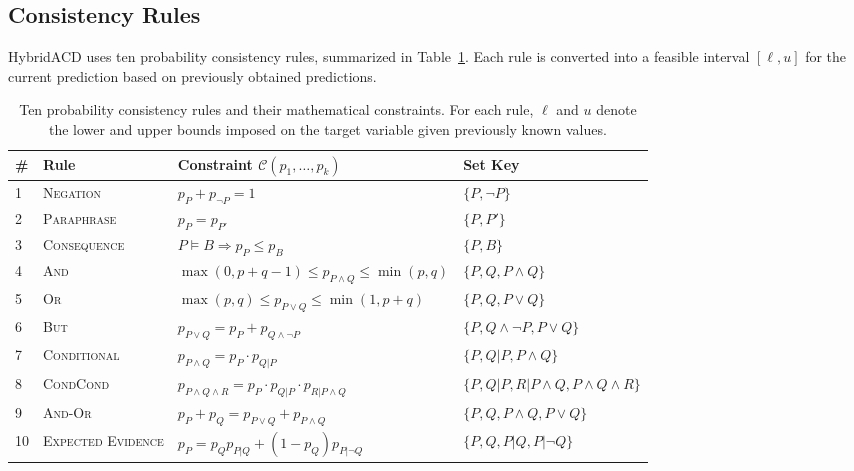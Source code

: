 \documentclass[pdflatex,sn-mathphys-num]{sn-jnl}
\begin{document}
\subsection{Consistency Rules}

HybridACD uses ten probability consistency rules, summarized in Table~\ref{tab:consistency_rules}. Each rule is converted into a feasible interval $[\ell,u]$ for the current prediction based on previously obtained predictions.

\begin{table}[h]
\caption{Ten probability consistency rules and their mathematical constraints.
  For each rule, $\ell$ and $u$ denote the lower and upper bounds imposed on the target variable
  given previously known values.}
\label{tab:consistency_rules}
\begin{tabular}{@{}llll@{}}
\toprule
\# & Rule & Constraint $\mathcal{C}(p_1, \ldots, p_k)$ & Set Key \\
\midrule
1 & \textsc{Negation}      & $p_P + p_{\neg P} = 1$                          & $\{P, \neg P\}$ \\
2 & \textsc{Paraphrase}    & $p_P = p_{P'}$                                  & $\{P, P'\}$ \\
3 & \textsc{Consequence}   & $P \models B \Rightarrow p_P \leq p_B$          & $\{P, B\}$ \\
4 & \textsc{And}           & $\max(0,p+q-1) \leq p_{P \wedge Q} \leq \min(p,q)$ & $\{P,Q,P\wedge Q\}$ \\
5 & \textsc{Or}            & $\max(p,q) \leq p_{P \vee Q} \leq \min(1,p+q)$ & $\{P,Q,P\vee Q\}$ \\
6 & \textsc{But}           & $p_{P \vee Q} = p_P + p_{Q \wedge \neg P}$     & $\{P,Q\wedge\neg P,P\vee Q\}$ \\
7 & \textsc{Conditional}   & $p_{P \wedge Q} = p_P \cdot p_{Q|P}$           & $\{P,Q|P,P\wedge Q\}$ \\
8 & \textsc{CondCond}      & $p_{P\wedge Q\wedge R} = p_P \cdot p_{Q|P} \cdot p_{R|P\wedge Q}$ & $\{P,Q|P,R|P\wedge Q,P\wedge Q\wedge R\}$ \\
9 & \textsc{And-Or}        & $p_P + p_Q = p_{P\vee Q} + p_{P\wedge Q}$      & $\{P,Q,P\wedge Q,P\vee Q\}$ \\
10 & \textsc{Expected Evidence} & $p_P = p_Q p_{P|Q} + (1-p_Q)p_{P|\neg Q}$ & $\{P,Q,P|Q,P|\neg Q\}$ \\
\bottomrule
\end{tabular}
\end{table}
\end{document}
